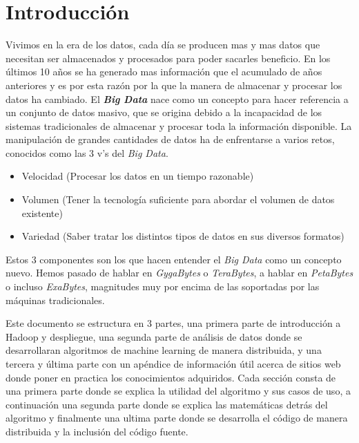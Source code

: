 \chapter*{Introducción}%

Vivimos en la era de los datos, cada día se producen mas y mas datos que
necesitan ser almacenados y procesados para poder sacarles beneficio.
En los últimos 10 años se ha generado mas información que el acumulado de años
anteriores y es por esta razón  por la que la manera de almacenar y procesar
los datos ha cambiado.
El \textbf{\textit{Big Data}}\label{big_data_def} nace como un concepto para hacer referencia a un 
conjunto de datos masivo, que se origina debido a la incapacidad de los sistemas tradicionales 
de almacenar y procesar toda la información disponible.
La manipulación de grandes cantidades de datos ha de enfrentarse a varios
retos, conocidos como las 3 v's del \textit{Big Data}.
\begin{itemize}
  \item Velocidad (Procesar los datos en un tiempo razonable)
  \item Volumen (Tener la tecnología suficiente para abordar el volumen de datos existente)
  \item Variedad (Saber tratar los distintos tipos de datos en sus diversos formatos)
\end{itemize}
Estos 3 componentes son los que hacen entender el \textit{Big Data} como un 
concepto nuevo. Hemos pasado de hablar en \textit{GygaBytes} o \textit{TeraBytes}, a hablar 
en \textit{PetaBytes} o incluso \textit{ExaBytes}, magnitudes muy por encima de las soportadas 
por las máquinas tradicionales.
\newline

Este documento se estructura en 3 partes, una primera parte de introducción a Hadoop y despliegue,
una segunda parte de análisis de datos donde se desarrollaran algoritmos de machine learning de manera distribuida, y una tercera y última parte con un apéndice de información útil acerca de sitios web 
donde poner en practica los conocimientos adquiridos.
Cada sección consta de una primera parte donde se explica la utilidad del algoritmo y sus casos de
uso, a continuación una segunda parte donde se explica las matemáticas detrás del algoritmo y 
finalmente una ultima parte donde se desarrolla el código de manera distribuida y la inclusión 
del código fuente.
\newline


